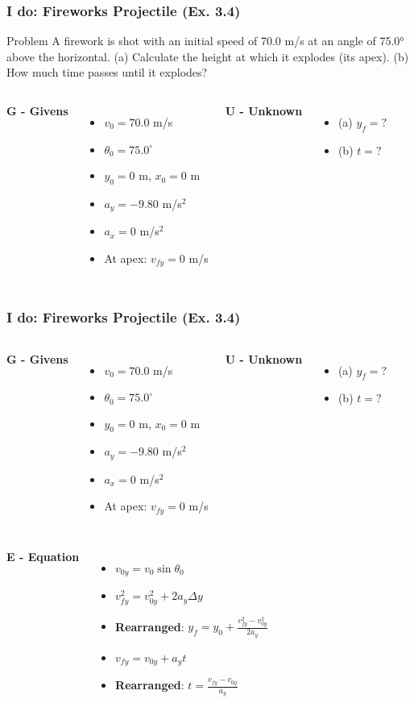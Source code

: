 \documentclass{beamer}
\begin{document}
\begin{frame}
\frametitle{I do: Fireworks Projectile (Ex. 3.4)}
\begin{block}{Problem}
A firework is shot with an initial speed of 70.0 m/s at an angle of 75.0° above the horizontal. (a) Calculate the height at which it explodes (its apex). (b) How much time passes until it explodes?
\end{block}
\pause
\begin{columns}[T]
\textbf{G - Givens}
\begin{itemize}
\item $v_0 = 70.0$ m/s
\item $\theta_0 = 75.0^\circ$
\item $y_0 = 0$ m, $x_0 = 0$ m
\item $a_y = -9.80$ m/s$^2$
\item $a_x = 0$ m/s$^2$
\item At apex: $v_{fy} = 0$ m/s
\end{itemize}
\pause
{}
\textbf{U - Unknown}
\begin{itemize}
\item (a) $y_f = ?$
\item (b) $t = ?$
\end{itemize}
\end{columns}
\end{frame}

\begin{frame}
\frametitle{I do: Fireworks Projectile (Ex. 3.4)}

\pause
\begin{columns}[T]
\textbf{G - Givens}
\begin{itemize}
\item $v_0 = 70.0$ m/s
\item $\theta_0 = 75.0^\circ$
\item $y_0 = 0$ m, $x_0 = 0$ m
\item $a_y = -9.80$ m/s$^2$
\item $a_x = 0$ m/s$^2$
\item At apex: $v_{fy} = 0$ m/s
\end{itemize}
\pause
{}
\textbf{U - Unknown}
\begin{itemize}
\item (a) $y_f = ?$
\item (b) $t = ?$
\end{itemize}
\end{columns}
\pause
\begin{columns}[T]
\textbf{E - Equation}
\begin{itemize}
\item $v_{0y} = v_0 \sin\theta_0$
\item $v_{fy}^2 = v_{0y}^2 + 2a_y\Delta y$
\item \textbf{Rearranged}: $y_f = y_0 + \frac{v_{fy}^2 - v_{0y}^2}{2a_y}$
\item $v_{fy} = v_{0y} + a_y t$
\item \textbf{Rearranged}: $t = \frac{v_{fy} - v_{0y}}{a_y}$
\end{itemize}
\end{columns}
\end{frame}
\end{document}
